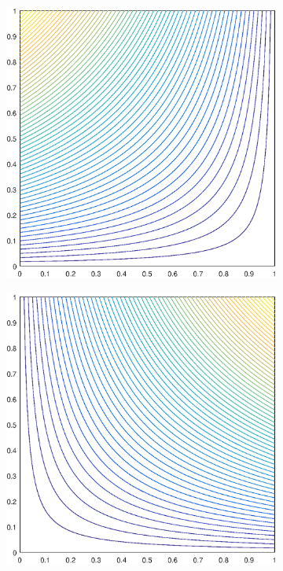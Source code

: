 \begin{figure}
\label{fig::2D_WACHSPRESS1_unit_square_basis_functions}
\centering
	\begin{subfigure}[b]{0.35\textwidth}
		\centering
		\includegraphics[width=\textwidth]{figures/sec_BF/square_WACHSPRESS1_contour_b4.eps}
		\caption{}
	\end{subfigure}
	\hspace{1cm}
	\begin{subfigure}[b]{0.35\textwidth}
		\centering
		\includegraphics[width=\textwidth]{figures/sec_BF/square_WACHSPRESS1_contour_b3.eps}

\end{subfigure}
\end{figure}

